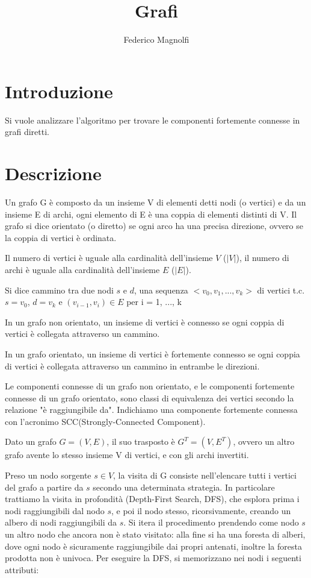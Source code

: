 \documentclass[]{article}
\begin{document}
\title{Grafi}
\author{Federico Magnolfi}
\maketitle

\section{Introduzione}
Si vuole analizzare l'algoritmo per trovare le componenti fortemente connesse in grafi diretti.

\section{Descrizione}
Un grafo G è composto da un insieme V di elementi detti nodi (o vertici) e da un insieme E di archi, ogni elemento di E è una coppia di elementi distinti di V. Il grafo si dice orientato (o diretto) se ogni arco ha una precisa direzione, ovvero se la coppia di vertici è ordinata.

Il numero di vertici è uguale alla cardinalità dell'insieme $V$ ($|V|$), il numero di archi è uguale alla cardinalità dell'insieme $E$ ($|E|$).

Si dice cammino tra due nodi $s$ e $d$, una sequenza $<v_0, v_1, ..., v_k>$ di vertici t.c. $s=v_0$, $d=v_k$ e $(v_{i-1},v_i)\in E$ per i = 1, ..., k

In un grafo non orientato, un insieme di vertici è connesso se ogni coppia di vertici è collegata attraverso un cammino.

In un grafo orientato, un insieme di vertici è fortemente connesso se ogni coppia di vertici è collegata attraverso un cammino in entrambe le direzioni.

Le componenti connesse di un grafo non orientato, e le componenti fortemente connesse di un grafo orientato, sono classi di equivalenza dei vertici secondo la relazione "è raggiungibile da". Indichiamo una componente fortemente connessa con l'acronimo SCC(Strongly-Connected Component).

Dato un grafo $G = (V, E)$, il suo trasposto è $G^T = (V, E^T)$, ovvero un altro grafo avente lo stesso insieme V di vertici, e con gli archi invertiti.

Preso un nodo sorgente $s\in V$, la visita di G consiste nell'elencare tutti i vertici del grafo a partire da $s$ secondo una determinata strategia. In particolare trattiamo la visita in profondità (Depth-First Search, DFS), che esplora prima i nodi raggiungibili dal nodo $s$, e poi il nodo stesso, ricorsivamente, creando un albero di nodi raggiungibili da $s$. Si itera il procedimento prendendo come nodo $s$ un altro nodo che ancora non è stato visitato: alla fine si ha una foresta di alberi, dove ogni nodo è sicuramente raggiungibile dai propri antenati, inoltre la foresta prodotta non è univoca. Per eseguire la DFS, si memorizzano nei nodi i seguenti attributi:
\end{document}
